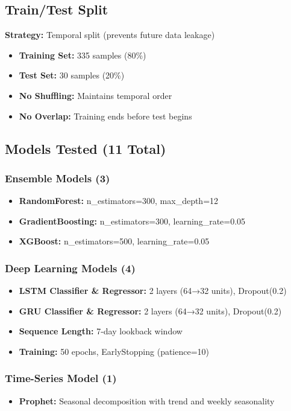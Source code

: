 \subsection{Train/Test Split}

\textbf{Strategy:} Temporal split (prevents future data leakage)
\begin{itemize}
    \item \textbf{Training Set:} 335 samples (80\%)
    \item \textbf{Test Set:} 30 samples (20\%)
    \item \textbf{No Shuffling:} Maintains temporal order
    \item \textbf{No Overlap:} Training ends before test begins
\end{itemize}

\subsection{Models Tested (11 Total)}

\subsubsection{Ensemble Models (3)}
\begin{itemize}
    \item \textbf{RandomForest:} n\_estimators=300, max\_depth=12
    \item \textbf{GradientBoosting:} n\_estimators=300, learning\_rate=0.05
    \item \textbf{XGBoost:} n\_estimators=500, learning\_rate=0.05
\end{itemize}

\subsubsection{Deep Learning Models (4)}
\begin{itemize}
    \item \textbf{LSTM Classifier \& Regressor:} 2 layers (64→32 units), Dropout(0.2)
    \item \textbf{GRU Classifier \& Regressor:} 2 layers (64→32 units), Dropout(0.2)
    \item \textbf{Sequence Length:} 7-day lookback window
    \item \textbf{Training:} 50 epochs, EarlyStopping (patience=10)
\end{itemize}

\subsubsection{Time-Series Model (1)}
\begin{itemize}
    \item \textbf{Prophet:} Seasonal decomposition with trend and weekly seasonality
\end{itemize}

